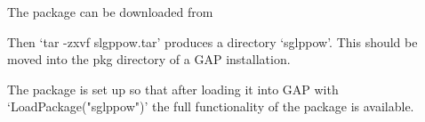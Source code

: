 

The package can be downloaded from

Then `tar -zxvf slgppow.tar' produces a directory `sglppow'. This should be
moved into the pkg directory of a GAP installation.

The package is set up so that after loading it into GAP with `LoadPackage("sglppow")'
the full functionality of the package is available.

